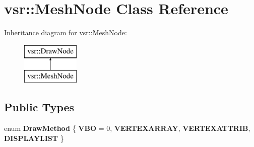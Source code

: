 \hypertarget{classvsr_1_1_mesh_node}{\section{vsr\-:\-:Mesh\-Node Class Reference}
\label{classvsr_1_1_mesh_node}
}
Inheritance diagram for vsr\-:\-:Mesh\-Node\-:\begin{figure}[H]
\begin{center}
\leavevmode
\includegraphics[height=2.000000cm]{classvsr_1_1_mesh_node}
\end{center}
\end{figure}
\subsection*{Public Types}
\begin{DoxyCompactItemize}
\item 
enum {\bfseries Draw\-Method} \{ {\bfseries V\-B\-O} =  0, 
{\bfseries V\-E\-R\-T\-E\-X\-A\-R\-R\-A\-Y}, 
{\bfseries V\-E\-R\-T\-E\-X\-A\-T\-T\-R\-I\-B}, 
{\bfseries D\-I\-S\-P\-L\-A\-Y\-L\-I\-S\-T}
 \}
\end{DoxyCompactItemize}
